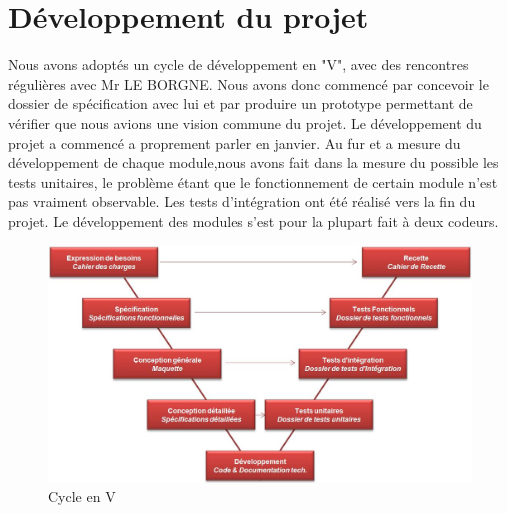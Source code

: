 \section{Développement du projet}

Nous avons adoptés un cycle de développement en "V", avec des rencontres régulières avec Mr LE BORGNE. Nous avons donc commencé par concevoir le dossier de spécification avec lui et par produire un prototype permettant de vérifier que nous avions une vision commune du projet. Le développement du projet a commencé a proprement parler en janvier. Au fur et a mesure du développement de chaque module,nous avons fait dans la mesure du possible les tests unitaires, le problème étant que le fonctionnement de certain module n'est pas vraiment observable. Les tests d'intégration ont été réalisé vers la fin du projet. Le développement des modules s'est pour la plupart fait à deux codeurs.

\begin{figure}[h!]
\center
\includegraphics[width=140mm]{Images/Cycle_en_V.jpg}
\caption{Cycle en V}
\end{figure}

